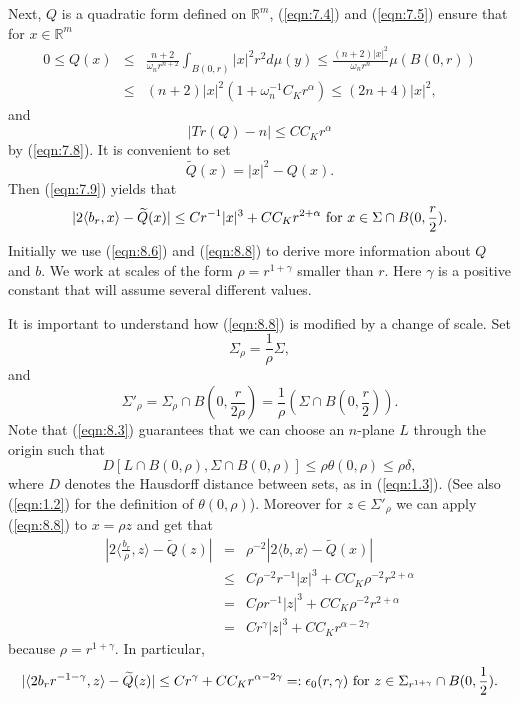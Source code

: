 \documentclass[12pt,leqno]{article}
\newcommand{\RR}{\mathbb{R}}
\theoremstyle{plain}
\numberwithin{equation}{section}
\begin{document}
\noindent
Next, $Q$ is a quadratic form defined on $\RR^{m}$, (\ref{eqn:7.4}) and
(\ref{eqn:7.5}) ensure that for $x\in\RR^{m}$
\begin{eqnarray}\label{eqn:8.5}
0  \le  Q(x)& \le &\frac{n+2}{\omega_nr^{n+2}}\int_{B(0,r)}|x|^2r^2d\mu(y)
 \le  \frac{(n+2)|x|^2}{\omega_nr^n}\mu(B(0,r))  \\
& \le & (n+2)|x|^2(1+\omega^{-1}_nC_Kr^\alpha)\le (2n+4)|x|^2, \nonumber
\end{eqnarray}
and
\begin{equation}\label{eqn:8.6}
|Tr(Q)-n|\le CC_Kr^\alpha
\end{equation}
by (\ref{eqn:7.8}). It is convenient to set
\begin{equation}\label{eqn:8.7}
\widetilde Q(x)=|x|^2-Q(x).
\end{equation}
Then (\ref{eqn:7.9}) yields that
\begin{equation}\label{eqn:8.8}
|2\langle b_r,x\rangle - \widetilde Q(x)|\le Cr^{-1}|x|^3+CC_Kr^{2+\alpha}
\hbox{ for }x\in\Sigma\cap B(0,\frac{r}{2}).
\end{equation}
Initially we use (\ref{eqn:8.6}) and (\ref{eqn:8.8}) to derive more
information about $Q$ and $b$.
We work at scales of the form $\rho=r^{1+\gamma}$ smaller than $r$.
Here $\gamma$ is a positive constant that will assume several
different values.

It is
important to understand how (\ref{eqn:8.8}) is modified by a change of
scale. Set
\begin{equation}\label{eqn:8.9}
\Sigma_\rho=\frac{1}{\rho}\Sigma,
\end{equation}
and
\begin{equation}\label{eqn:8.10}
\Sigma'_\rho=\Sigma_\rho\cap B(0, \frac{r}{2\rho})=\frac{1}{\rho}(\Sigma\cap
B(0,\frac{r}{2})).
\end{equation}
Note that (\ref{eqn:8.3}) guarantees that we can choose an $n$-plane $L$
through the origin such that
\begin{equation}\label{eqn:8.21}
D[L\cap B(0,\rho), \Sigma\cap B(0,\rho)]\le\rho\theta(0,\rho)\le \rho\delta,
\end{equation}
where $D$ denotes the Hausdorff distance between sets, as in (\ref{eqn:1.3}).
(See also (\ref{eqn:1.2}) for the definition of $\theta(0,\rho)$).
Moreover for $z\in\Sigma'_\rho$ we can apply (\ref{eqn:8.8}) to $x=\rho z$
and get that
\begin{eqnarray}\label{eqn:8.11}
|2\langle \frac{b_r}{\rho}, z\rangle - \widetilde Q(z)| & = &
\rho^{-2}|2\langle b,x\rangle - \widetilde Q(x)| \\
& \le & C\rho^{-2}r^{-1}|x|^3 + CC_K\rho^{-2}r^{2+\alpha} \nonumber \\
& = & C\rho r^{-1}|z|^3 + CC_K\rho^{-2}r^{2+\alpha} \nonumber \\
& = & Cr^\gamma |z|^3 + CC_Kr^{\alpha-2\gamma} \nonumber
\end{eqnarray}
because $\rho=r^{1+\gamma}$. In particular,
\begin{equation}\label{eqn:8.12}
|\langle 2b_r r^{-1-\gamma}, z\rangle - \widetilde Q(z)| \le Cr^\gamma +
CC_Kr^{\alpha-2\gamma} =:\epsilon_0(r,\gamma)
\hbox{ for }z\in\Sigma_{r^{1+\gamma}}\cap B(0, \frac{1}{2}).
\end{equation}
\end{document}
